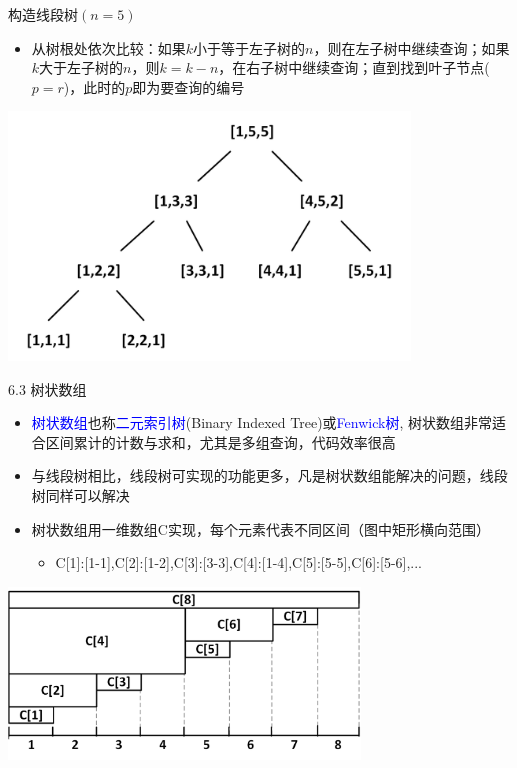 \begin{frame}{构造线段树$(n=5)$}
    \begin{itemize}
        \item  从树根处依次比较：如果$k$小于等于左子树的$n$，则在左子树中继续查询；如果$k$大于左子树的$n$，则$k=k-n$，在右子树中继续查询；直到找到叶子节点($p=r$)，此时的$p$即为要查询的编号
    \end{itemize}
    \includegraphics[width=0.8\textwidth,center]{fig/6-4.png}
\end{frame}
\begin{frame}{6.3 树状数组}
    \begin{itemize}
        \item \textcolor{blue}{树状数组}也称\textcolor{blue}{二元索引树}(Binary Indexed Tree)或\textcolor{blue}{Fenwick树}, 树状数组非常适合区间累计的计数与求和，尤其是多组查询，代码效率很高
        \item 与线段树相比，线段树可实现的功能更多，凡是树状数组能解决的问题，线段树同样可以解决
        \item 树状数组用一维数组C实现，每个元素代表不同区间（图中矩形横向范围）
        \begin{itemize}
            \item C[1]:[1-1],C[2]:[1-2],C[3]:[3-3],C[4]:[1-4],C[5]:[5-5],C[6]:[5-6],...
        \end{itemize}
    \end{itemize}
    \includegraphics[width=0.7\textwidth,center]{fig/6-5.png}
\end{frame}

